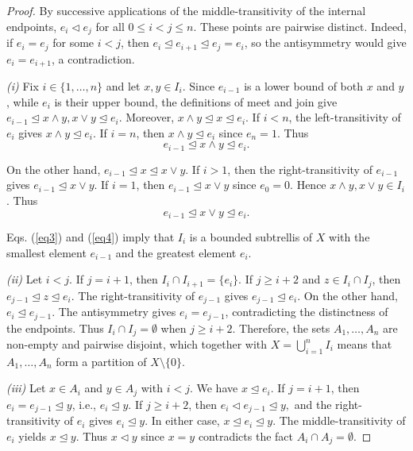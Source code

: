 \documentclass[preprint,12pt]{elsarticle}
\begin{document}
\begin{proof}
By successive applications of the middle-transitivity
of the internal endpoints,
$
e_i\triangleleft e_j
$
 for all $0\le i<j\le n$. These points are pairwise distinct. Indeed, if $e_i=e_j$
for some $i<j$, then
$e_i\trianglelefteq e_{i+1}\trianglelefteq e_j=e_i$,
so the antisymmetry would give $e_i=e_{i+1}$, a contradiction.

\emph{(i)}
Fix $i\in\{1,\ldots,n\}$ and let $x,y\in I_i$.
Since $e_{i-1}$ is a lower bound of both $x$ and $y$, while
$e_i$ is their upper bound, the definitions of meet and join give
$
e_{i-1}\trianglelefteq x\wedge y,
x\vee y\trianglelefteq e_i.
$
Moreover,
$
x\wedge y\trianglelefteq x\trianglelefteq e_i.
$
If $i<n$, the left-transitivity of $e_i$ gives
$x\wedge y\trianglelefteq e_i$. If $i=n$, then $x\wedge y\trianglelefteq e_i$ since $e_n=1$. Thus \begin{equation}\label{eq3}e_{i-1}\trianglelefteq x\wedge y\trianglelefteq e_i.\end{equation}

On the other hand,
$
e_{i-1}\trianglelefteq x\trianglelefteq x\vee y.
$
If $i>1$, then the right-transitivity of $e_{i-1}$ gives
$e_{i-1}\trianglelefteq x\vee y$. If $i=1$, then $e_{i-1}\trianglelefteq x\vee y$ since $e_0=0$.
Hence $x\wedge y,x\vee y\in I_i$. Thus \begin{equation}\label{eq4}e_{i-1}\trianglelefteq x\vee y\trianglelefteq e_i.\end{equation}

Eqs. (\ref{eq3}) and (\ref{eq4}) imply that $I_i$ is a bounded
subtrellis of $X$ with the smallest element $e_{i-1}$ and the greatest
element $e_i$.

\emph{(ii)}
Let $i<j$. If $j=i+1$, then
$
I_i\cap I_{i+1}=\{e_i\}.
$
If $j\ge i+2$ and $z\in I_i\cap I_j$, then
$
e_{j-1}\trianglelefteq z\trianglelefteq e_i.
$
The right-transitivity of $e_{j-1}$ gives
$e_{j-1}\trianglelefteq e_i$.
On the other hand, $e_i\trianglelefteq e_{j-1}$.
The antisymmetry gives $e_i=e_{j-1}$,
contradicting the distinctness of the endpoints.
Thus
$
I_i\cap I_j=\emptyset
$
when $j\ge i+2$. Therefore, the sets $A_1,\ldots,A_n$ are non-empty and pairwise disjoint, which together with $X=\bigcup_{i=1}^{n}I_i$ means that
$A_1,\ldots,A_n$ form a partition of $X\setminus\{0\}$.

\emph{(iii)}
Let $x\in A_i$ and $y\in A_j$ with $i<j$.
We have $x\trianglelefteq e_i$.
If $j=i+1$, then $e_i=e_{j-1}\trianglelefteq y$, i.e., $e_i\trianglelefteq y$.
If $j\ge i+2$, then
$
e_i\triangleleft e_{j-1}\trianglelefteq y,
$
and the right-transitivity of $e_i$ gives
$e_i\trianglelefteq y$.
In either case,
$
x\trianglelefteq e_i\trianglelefteq y.
$
The middle-transitivity of $e_i$ yields
$x\trianglelefteq y$. Thus $x\triangleleft y$ since $x=y$ contradicts the fact
$A_i\cap A_j=\emptyset$.
\end{proof}
\end{document}
